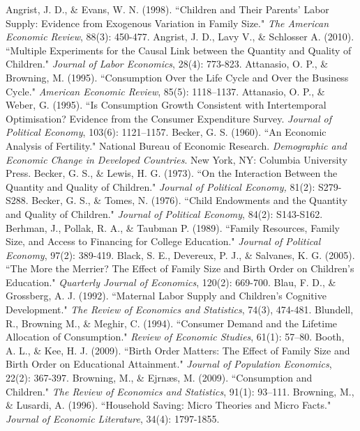 \documentclass[12pt]{extarticle}
\begin{document}
\pagebreak
\begin{thebibliography}{50}
\bibitem{}
Angrist, J. D., \& Evans, W. N. (1998). ``Children and Their Parents’ Labor Supply: Evidence from Exogenous Variation in Family Size." \textit{The American Economic Review}, 88(3): 450-477.
\bibitem{}
Angrist, J. D., Lavy V., \& Schlosser A. (2010). ``Multiple Experiments for the Causal Link between the Quantity and Quality of Children." \textit{Journal of Labor Economics}, 28(4): 773-823.
\bibitem{}
Attanasio, O. P., \& Browning, M. (1995). ``Consumption Over the Life Cycle and Over the Business Cycle." \textit{American Economic Review}, 85(5): 1118–1137.
\bibitem{}
Attanasio, O. P., \& Weber, G. (1995). ``Is Consumption Growth Consistent with Intertemporal Optimisation? Evidence from the Consumer Expenditure Survey. \textit{Journal of Political Economy}, 103(6): 1121–1157.
\bibitem{}
Becker, G. S. (1960). ``An Economic Analysis of Fertility." National Bureau of Economic Research. \textit{Demographic and Economic Change in Developed Countries}. New York, NY: Columbia University Press.
\bibitem{}
Becker, G. S., \& Lewis, H. G. (1973). ``On the Interaction Between the Quantity and Quality of Children." \textit\textit{Journal of Political Economy,} 81(2): S279-S288.
\bibitem{}
Becker, G. S., \& Tomes, N. (1976). ``Child Endowments and the Quantity and Quality of Children." \textit{Journal of Political Economy}, 84(2): S143-S162.
\bibitem{}
Berhman, J., Pollak, R. A., \& Taubman P. (1989). ``Family Resources, Family Size, and Access to Financing for College Education." \textit{Journal of Political Economy}, 97(2): 389-419.
\bibitem{}
Black, S. E., Devereux, P. J., \& Salvanes, K. G. (2005). ``The More the Merrier? The Effect of Family Size and Birth Order on Children’s Education." \textit{Quarterly Journal of Economics}, 120(2): 669-700.
\bibitem{}
Blau, F. D., \& Grossberg, A. J. (1992). ``Maternal Labor Supply and Children’s Cognitive Development." \textit{The Review of Economics and Statistics}, 74(3), 474-481.
\bibitem{}
Blundell, R., Browning M., \& Meghir, C. (1994). ``Consumer Demand and the Lifetime Allocation of Consumption." \textit{Review of Economic Studies}, 61(1): 57–80.
\bibitem{}
Booth, A. L., \& Kee, H. J. (2009). ``Birth Order Matters: The Effect of Family Size and Birth Order on Educational Attainment." \textit{Journal of Population Economics}, 22(2): 367-397.
\bibitem{}
Browning, M., \& Ejrnæs, M. (2009). ``Consumption and Children." \textit{The Review of Economics and Statistics}, 91(1): 93–111.
\bibitem{}
Browning, M., \& Lusardi, A. (1996). ``Household Saving: Micro Theories and Micro Facts." \textit{Journal of Economic Literature}, 34(4): 1797-1855. 

\end{thebibliography}
\end{document}
